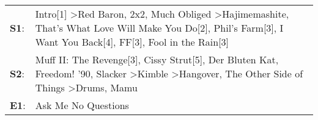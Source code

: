\begin{supertabular}{p{0.03\textwidth}p{0.92\textwidth}}
 \textbf{S1}:  &  Intro[1]\textsuperscript{} \textgreater \enspace Red Baron\textsuperscript{}, \enspace 2x2\textsuperscript{}, \enspace Much Obliged\textsuperscript{} \textgreater \enspace Hajimemashite\textsuperscript{}, \enspace That's What Love Will Make You Do[2]\textsuperscript{}, \enspace Phil's Farm[3]\textsuperscript{}, \enspace I Want You Back[4]\textsuperscript{}, \enspace FF[3]\textsuperscript{}, \enspace Fool in the Rain[3]\textsuperscript{}  \enspace  \\
 \textbf{S2}:  &          Muff II: The Revenge[3]\textsuperscript{}, \enspace Cissy Strut[5]\textsuperscript{}, \enspace Der Bluten Kat\textsuperscript{}, \enspace Freedom! '90\textsuperscript{}, \enspace Slacker\textsuperscript{} \textgreater \enspace Kimble\textsuperscript{} \textgreater \enspace Hangover\textsuperscript{}, \enspace The Other Side of Things\textsuperscript{} \textgreater \enspace Drums\textsuperscript{}, \enspace Mamu\textsuperscript{}  \enspace  \\
 \textbf{E1}:  &                                                                                                                                                                                                                                                                                                                                                                                                                     Ask Me No Questions\textsuperscript{}  \enspace  \\
\end{supertabular}
